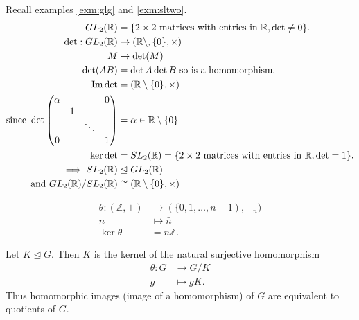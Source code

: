 \begin{example}
Recall examples \ref{exm:glg} and \ref{exm:sltwo}.
\begin{align*}
    GL_2 (\mathbb{R}) &= \{ 2 \times 2 \text{ matrices with entries in } \mathbb{R}, \det \neq 0 \}. \\
    \det : GL_2 (\mathbb{R}) &\to (\mathbb{R} \setminus, \{0 \}, \times) \\
    M &\mapsto \det (M) \\
    \det (AB) &= \det A \det B \text{ so is a homomorphism}. \\
    \operatorname{Im} \det &= (\mathbb{R} \setminus \{ 0 \}, \times) \\
    \text{since } \det \begin{pmatrix}
        \alpha &  &  & \smash{\huge 0} \\
         & 1 & &  \\
         &  & \ddots &  \\
        \huge 0 &  &  & 1
    \end{pmatrix} &= \alpha \in \mathbb{R} \setminus \{ 0 \} \\
    \ker \det &= SL_2 (\mathbb{R}) = \{ 2 \times 2 \text{ matrices with entries in } \mathbb{R}, \det = 1 \}. \\
    \implies SL_2(\mathbb{R}) &\trianglelefteq GL_2(\mathbb{R}) \\
    \text{and } GL_2 (\mathbb{R}) / SL_2 (\mathbb{R}) &\cong ( \mathbb{R} \setminus \{ 0 \}, \times)
\end{align*}
\end{example}

\begin{example}
\begin{align*}
    \theta : (\mathbb{Z}, +) &\to ( \{ 0, 1, \ldots, n-1), +_n) \\
    n &\mapsto \bar{n} \\
    \ker \theta &= n \mathbb{Z}.
\end{align*}
\end{example}

\begin{remark}
Let \(K \trianglelefteq G\).
Then \(K\) is the kernel of the natural surjective homomorphism
\begin{align*}
    \theta : G &\to G / K \\
    g &\mapsto gK.
\end{align*}
Thus homomorphic images (image of a homomorphism) of \(G\) are equivalent to quotients of \(G\).
\end{remark}

